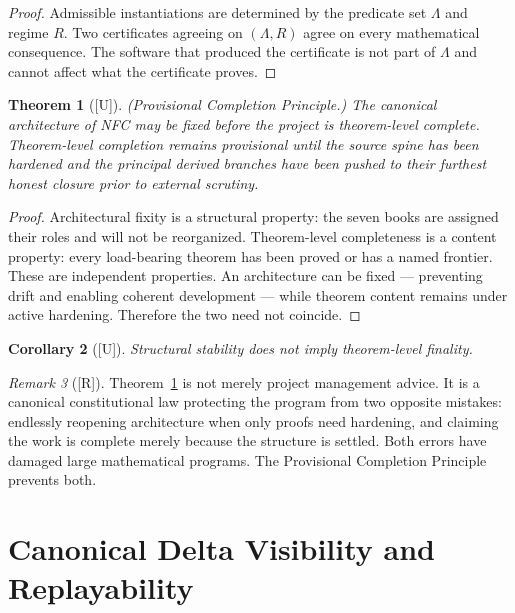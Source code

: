 \documentclass[12pt,oneside]{amsbook}
\theoremstyle{plain}
\newtheorem{theorem}{Theorem}[section]
\newtheorem{corollary}[theorem]{Corollary}
\theoremstyle{definition}
\theoremstyle{remark}
\newtheorem{remark}[theorem]{Remark}
\newcommand{\status}[1]{\textup{[#1]}}
\begin{document}
\begin{proof}
Admissible instantiations are determined by the predicate set
$\Lambda$ and regime $R$.  Two certificates agreeing on $(\Lambda, R)$
agree on every mathematical consequence.  The software that produced
the certificate is not part of $\Lambda$ and cannot affect what the
certificate proves.
\end{proof}

\begin{theorem}[\status{U}]\label{thm:provisional-completion}
\textup{(Provisional Completion Principle.)}  The canonical
architecture of NFC may be fixed before the project is
theorem-level complete.  Theorem-level completion remains provisional
until the source spine has been hardened and the principal derived
branches have been pushed to their furthest honest closure prior to
external scrutiny.
\end{theorem}

\begin{proof}
Architectural fixity is a structural property: the seven books are
assigned their roles and will not be reorganized.  Theorem-level
completeness is a content property: every load-bearing theorem has
been proved or has a named frontier.  These are independent properties.
An architecture can be fixed --- preventing drift and enabling coherent
development --- while theorem content remains under active hardening.
Therefore the two need not coincide.
\end{proof}

\begin{corollary}[\status{U}]\label{cor:stability-not-finality}
Structural stability does not imply theorem-level finality.
\end{corollary}

\begin{remark}[\status{R}]\label{rmk:provisional-principle-canonical}
Theorem~\ref{thm:provisional-completion} is not merely project
management advice.  It is a canonical constitutional law protecting the
program from two opposite mistakes: endlessly reopening architecture
when only proofs need hardening, and claiming the work is complete
merely because the structure is settled.  Both errors have damaged
large mathematical programs.  The Provisional Completion Principle
prevents both.
\end{remark}

\section{Canonical Delta Visibility and Replayability}
\end{document}

